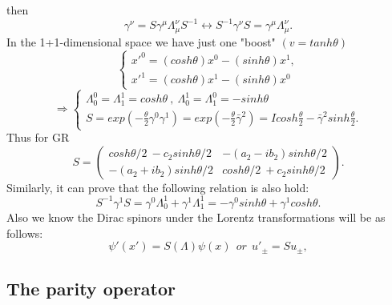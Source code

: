 \documentclass[twocolumn,aps,prb,showpacs]{revtex4-1}
\begin{document}
then
\begin{equation}
	\gamma^{\nu}=S\gamma^{\mu}\Lambda_{\mu}^{\nu}S^{-1}\longleftrightarrow S^{-1}\gamma^{\nu}S=\gamma^{\mu}\Lambda_{\mu}^{\nu}.
\end{equation}
In the 1+1-dimensional space we have just one "boost" $ (v=tanh\theta) $
\begin{equation}
	\begin{cases}
		x'^{0}=(cosh\theta)x^{0}-(sinh\theta)x^{1}, \\ x'^{1}=(cosh\theta)x^{1}-(sinh\theta)x^{0} 
	\end{cases}
\end{equation}
\begin{equation}
	\Rightarrow
	\begin{cases}
		\Lambda_{0}^{0}=\Lambda_{1}^{1}=cosh\theta \ , \  \Lambda_{0}^{1}=\Lambda_{1}^{0}=-sinh\theta \\
		S=exp(-\frac{\theta}{2}\gamma^{0}\gamma^{1})
		=exp(-\frac{\theta}{2}\bar{\gamma}^{2})=Icosh\frac{\theta}{2}-\bar{\gamma}^{2}sinh\frac{\theta}{2}.
	\end{cases}
\end{equation}
Thus for GR
\begin{equation}
	S=
	\begin{pmatrix}
		cosh \theta/2 \ -c_{2}sinh \theta/2 & -(a_{2}-ib_{2})sinh \theta/2 \\
		-(a_{2}+ib_{2})sinh \theta/2 & cosh \theta/2 \  +c_{2}sinh \theta/2
	\end{pmatrix}.
\end{equation}
Similarly, it can prove that the following relation is also hold:
\begin{equation}
	S^{-1}\gamma^{1}S=\gamma^{0}\Lambda_{0}^{1}+
	\gamma^{1}\Lambda_{1}^{1}=-\gamma^{0} sinh\theta+\gamma^{1}cosh\theta
	.\end{equation}
Also we know the Dirac spinors under the Lorentz transformations will be as follows:
\begin{equation}
	\psi'(x')=S(\Lambda)\psi(x) \ \ or \ \ u'_{\pm}=Su_{\pm}
	,\end{equation}



\subsection{The parity operator}
\label{sec:3}
\end{document}
